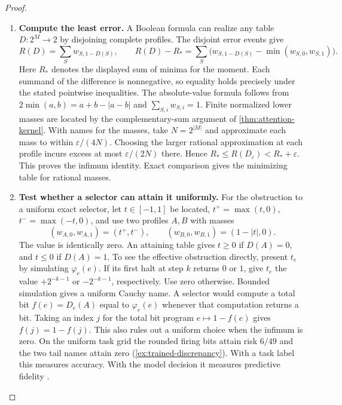 \documentclass[11pt,a4paper]{article}
\theoremstyle{definition}
\theoremstyle{remark}\newaliascnt{remark}{theorem}
\numberwithin{equation}{section}
\begin{document}
\begin{proof}\leavevmode
\begin{enumerate}[titledsteps]
    \item \textbf{Compute the least error.} A Boolean formula can realize any table \(D:2^M\to2\) by disjoining complete profiles. The disjoint error events give
\[
 R(D)=\sum_S w_{S,1-D(S)},\qquad
 R(D)-R_*=\sum_S\bigl(w_{S,1-D(S)}-\min(w_{S,0},w_{S,1})\bigr).
\]
Here \(R_*\) denotes the displayed sum of minima for the moment. Each summand of the difference is nonnegative, so equality holds precisely under the stated pointwise inequalities. The absolute-value formula follows from \(2\min(a,b)=a+b-|a-b|\) and \(\sum_{S,i}w_{S,i}=1\). Finite normalized lower masses are located by the complementary-sum argument of \cref{thm:attention-kernel}. With names for the masses, take \(N=2^{|M|}\) and approximate each mass to within \(\varepsilon/(4N)\). Choosing the larger rational approximation at each profile incurs excess at most \(\varepsilon/(2N)\) there. Hence \(R_*\le R(D_\varepsilon)<R_*+\varepsilon\). This proves the infimum identity. Exact comparison gives the minimizing table for rational masses.


    \item \textbf{Test whether a selector can attain it uniformly.} For the obstruction to a uniform exact selector, let \(t\in[-1,1]\) be located, \(t^+=\max(t,0)\), \(t^-=\max(-t,0)\), and use two profiles \(A,B\) with masses
\[
 (w_{A,0},w_{A,1})=(t^+,t^-),\qquad
 (w_{B,0},w_{B,1})=(1-|t|,0).
\]
The value is identically zero. An attaining table gives \(t\ge0\) if \(D(A)=0\), and \(t\le0\) if \(D(A)=1\). To see the effective obstruction directly, present \(t_e\) by simulating \(\varphi_e(e)\). If its first halt at step \(k\) returns \(0\) or \(1\), give \(t_e\) the value \(+2^{-k-1}\) or \(-2^{-k-1}\), respectively. Use zero otherwise. Bounded simulation gives a uniform Cauchy name. A selector would compute a total bit \(f(e)=D_e(A)\) equal to \(\varphi_e(e)\) whenever that computation returns a bit. Taking an index \(j\) for the total bit program \(e\mapsto1-f(e)\) gives \(f(j)=1-f(j)\). This also rules out a uniform choice when the infimum is zero. On the uniform task grid the rounded firing bits attain risk \(6/49\) and the two tail names attain zero (\cref{ex:trained-discrepancy}). With a task label this measures accuracy. With the model decision it measures predictive fidelity \cite{concept-completeness}.\qedhere
\end{enumerate}
\end{proof}
\end{document}
